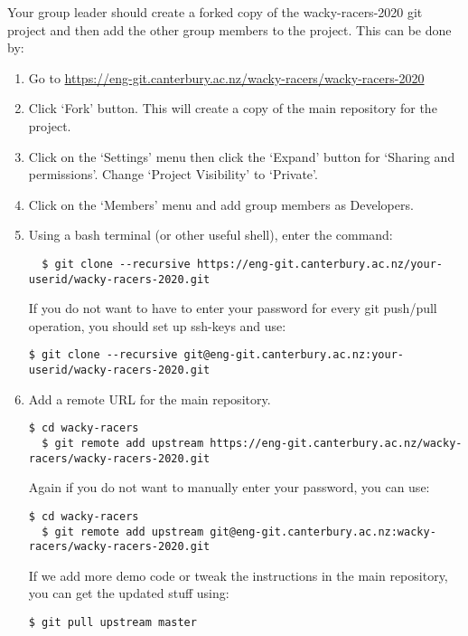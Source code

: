\documentclass[11pt, a4paper]{article}
\begin{document}
Your group leader should create a forked copy of the wacky-racers-2020
git project and then add the other group members to the project.  This
can be done by:

\begin{enumerate}
\item Go to \url{https://eng-git.canterbury.ac.nz/wacky-racers/wacky-racers-2020}

\item Click `Fork' button.  This will create a copy of the main repository for the project.

\item Click on the `Settings' menu then click the `Expand' button for
`Sharing and permissions'.  Change `Project Visibility' to `Private'.

\item Click on the `Members' menu and add group members as Developers.

\item Using a bash terminal (or other useful shell), enter the command:

  \lstset{language=bash}
  \lstset{basicstyle=\ttfamily\small}
  \lstset{breaklines}
  
\begin{lstlisting}
  $ git clone --recursive https://eng-git.canterbury.ac.nz/your-userid/wacky-racers-2020.git  
\end{lstlisting}

If you do not want to have to enter your password for every git
push/pull operation, you should set up ssh-keys and use:

\begin{lstlisting}[breaklines]
  $ git clone --recursive git@eng-git.canterbury.ac.nz:your-userid/wacky-racers-2020.git
\end{lstlisting}

\item Add a remote URL for the main repository.
%
\begin{lstlisting}[breaklines]
  $ cd wacky-racers 
  $ git remote add upstream https://eng-git.canterbury.ac.nz/wacky-racers/wacky-racers-2020.git  
\end{lstlisting}
%
Again if you do not want to manually enter your password, you can use:
%
\begin{lstlisting}[breaklines]
  $ cd wacky-racers 
  $ git remote add upstream git@eng-git.canterbury.ac.nz:wacky-racers/wacky-racers-2020.git    
\end{lstlisting}
%
If we add more demo code or tweak the instructions in the main
repository, you can get the updated stuff using:
%
\begin{lstlisting}[breaklines]
  $ git pull upstream master
\end{lstlisting}
\end{enumerate}
\end{document}
